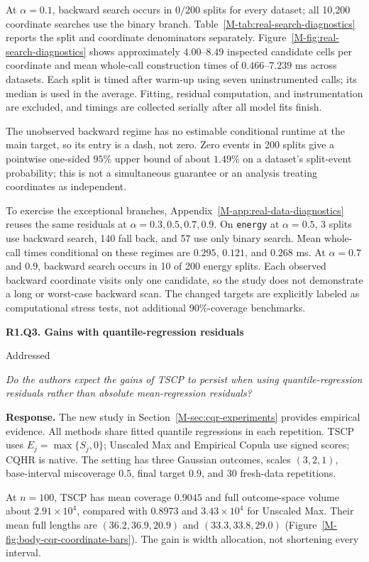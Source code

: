 \documentclass[11pt]{article}
\newcommand{\mssec}[1]{Section~\ref*{M-#1}}
\newcommand{\msapp}[1]{Appendix~\ref*{M-#1}}
\newcommand{\msfig}[1]{Figure~\ref*{M-#1}}
\newcommand{\mstab}[1]{Table~\ref*{M-#1}}
\newcommand{\point}[3]{\par\Needspace{7\baselineskip}\medskip
\noindent\parbox[t]{0.77\linewidth}{\textbf{#1}}\hfill
\parbox[t]{0.21\linewidth}{\raggedleft\small\sffamily #2}\par\nopagebreak
{\color{ReviewerBlue}\small\itshape #3\par}\textbf{Response.} }
\begin{document}
At $\alpha=0.1$, backward search occurs in $0/200$ splits for every dataset; all 10,200 coordinate searches use the binary branch. \mstab{tab:real-search-diagnostics} reports the split and coordinate denominators separately. \msfig{fig:real-search-diagnostics} shows approximately $4.00$--$8.49$ inspected candidate cells per coordinate and mean whole-call construction times of $0.466$--$7.239$ ms across datasets. Each split is timed after warm-up using seven uninstrumented calls; its median is used in the average. Fitting, residual computation, and instrumentation are excluded, and timings are collected serially after all model fits finish.

The unobserved backward regime has no estimable conditional runtime at the main target, so its entry is a dash, not zero. Zero events in 200 splits give a pointwise one-sided $95\%$ upper bound of about $1.49\%$ on a dataset's split-event probability; this is not a simultaneous guarantee or an analysis treating coordinates as independent.

To exercise the exceptional branches, \msapp{app:real-data-diagnostics} reuses the same residuals at $\alpha=0.3,0.5,0.7,0.9$. On \texttt{energy} at $\alpha=0.5$, 3 splits use backward search, 140 fall back, and 57 use only binary search. Mean whole-call times conditional on these regimes are $0.295$, $0.121$, and $0.268$ ms. At $\alpha=0.7$ and $0.9$, backward search occurs in 10 of 200 energy splits. Each observed backward coordinate visits only one candidate, so the study does not demonstrate a long or worst-case backward scan. The changed targets are explicitly labeled as computational stress tests, not additional $90\%$-coverage benchmarks.

\point{R1.Q3. Gains with quantile-regression residuals}{Addressed}{Do the authors expect the gains of TSCP to persist when using
quantile-regression residuals rather than absolute mean-regression
residuals?}
\label{response:R1.Q3}
The new study in \mssec{sec:cqr-experiments} provides empirical evidence. All methods share fitted quantile regressions in each repetition. TSCP uses $E_j=\max\{S_j,0\}$; Unscaled Max and Empirical Copula use signed scores; CQHR is native. The setting has three Gaussian outcomes, scales $(3,2,1)$, base-interval miscoverage $0.5$, final target $0.9$, and 30 fresh-data repetitions.

At $n=100$, TSCP has mean coverage $0.9045$ and full outcome-space volume about $2.91\times10^4$, compared with $0.8973$ and $3.43\times10^4$ for Unscaled Max. Their mean full lengths are $(36.2,36.9,20.9)$ and $(33.3,33.8,29.0)$ (\msfig{fig:body-cqr-coordinate-bars}). The gain is width allocation, not shortening every interval.
\end{document}
